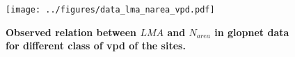 \documentclass[a4paper,11pt]{article}
\begin{document}
\begin{figure}[H]
\centering
\texttt{[image: ../figures/data\_lma\_narea\_vpd.pdf]}
\caption{\textbf{Observed relation between $LMA$ and
    $N_{area}$ in glopnet data \citep{Wright-2004} for different class
    of vpd of the sites.}
\label{fig:lma_narea_glopnet}}
\end{figure}


\clearpage



\end{document}
